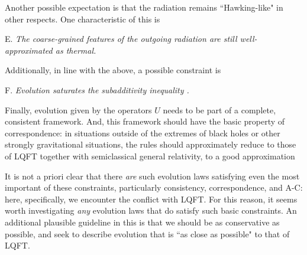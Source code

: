 Another possible expectation is that the radiation remains ``Hawking-like"  in other respects.  One characteristic of this is 

\item{E.} {\it The coarse-grained features of the outgoing radiation are still well-approximated as thermal.}

Additionally, in line with the above, a possible constraint is

\item{F.} {\it Evolution saturates the subadditivity inequality \subadd.}



Finally, evolution given by the operators $U$ needs to be part of a complete, consistent framework.  And, this framework should have the basic property of correspondence: in situations outside of the extremes of black holes or other strongly gravitational situations, the rules should approximately reduce to those of LQFT together with semiclassical general relativity, to a good approximation

It is not a priori clear that there {\it are} such evolution laws satisfying even the most important of these constraints, particularly consistency, correspondence, and A-C: here, specifically, we encounter the conflict with LQFT.  For this reason, it seems worth investigating {\it any} evolution laws that do satisfy such basic constraints.  An additional plausible guideline in this is that we should be as conservative as possible, and seek to describe evolution that is ``as close as possible" to that of LQFT.




